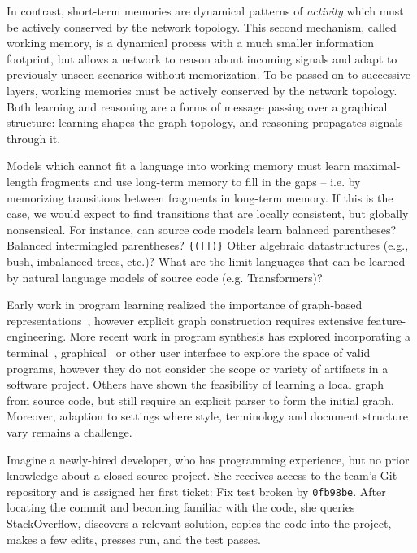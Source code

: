 \documentclass[10pt]{article}
\begin{document}
In contrast, short-term memories are dynamical patterns of \textit{activity} which must be actively conserved by the network topology. This second mechanism, called working memory, is a dynamical process with a much smaller information footprint, but allows a network to reason about incoming signals and adapt to previously unseen scenarios without memorization. To be passed on to successive layers, working memories must be actively conserved by the network topology. Both learning and reasoning are a forms of message passing over a graphical structure: learning shapes the graph topology, and reasoning propagates signals through it.

Models which cannot fit a language into working memory must learn maximal-length fragments and use long-term memory to fill in the gaps -- i.e. by memorizing transitions between fragments in long-term memory. If this is the case, we would expect to find transitions that are locally consistent, but globally nonsensical. For instance, can source code models learn balanced parentheses? Balanced intermingled parentheses? \texttt{\{([])\}} Other algebraic datastructures (e.g., bush, imbalanced trees, etc.)? What are the limit languages that can be learned by natural language models of source code (e.g. Transformers)?

Early work in program learning realized the importance of graph-based representations~\cite{allamanis2017learning}, however explicit graph construction requires extensive feature-engineering. More recent work in program synthesis has explored incorporating a terminal~\cite{ellis2019write}, graphical~\cite{walke2020learning} or other user interface to explore the space of valid programs, however they do not consider the scope or variety of artifacts in a software project. Others have shown the feasibility of learning a local graph~\cite{johnson2020learning} from source code, but still require an explicit parser to form the initial graph. Moreover, adaption to settings where style, terminology and document structure vary remains a challenge.

Imagine a newly-hired developer, who has programming experience, but no prior knowledge about a closed-source project. She receives access to the team's Git repository and is assigned her first ticket: Fix test broken by \texttt{0fb98be}. After locating the commit and becoming familiar with the code, she queries StackOverflow, discovers a relevant solution, copies the code into the project, makes a few edits, presses run, and the test passes.
\end{document}
